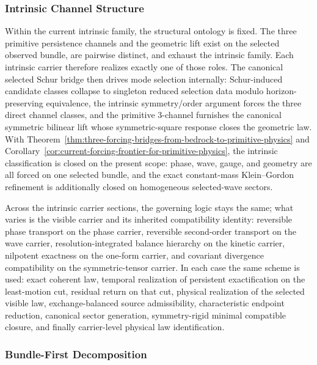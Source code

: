 \subsubsection{Intrinsic Channel Structure}

Within the current intrinsic family, the structural ontology is fixed. The
three primitive persistence channels and the geometric lift exist on the
selected observed bundle, are pairwise distinct, and exhaust the intrinsic
family. Each intrinsic carrier therefore realizes exactly one of
those roles. The canonical selected Schur bridge then drives mode selection
internally: Schur-induced candidate classes collapse to singleton reduced
selection data modulo horizon-preserving equivalence, the intrinsic
symmetry/order argument forces the three direct channel classes, and the
primitive \(3\)-channel furnishes the canonical symmetric bilinear lift whose
symmetric-square response closes the geometric law. With
Theorem~\ref{thm:three-forcing-bridges-from-bedrock-to-primitive-physics} and
Corollary~\ref{cor:current-forcing-frontier-for-primitive-physics}, the
intrinsic classification is closed on the present scope:
phase, wave, gauge, and geometry are all forced on one selected bundle, and
the exact constant-mass Klein--Gordon refinement is additionally closed on
homogeneous selected-wave sectors.

Across the intrinsic carrier sections, the governing logic stays the same; what varies
is the visible carrier and its inherited compatibility identity: reversible
phase transport on the phase carrier, reversible second-order transport on the
wave carrier, resolution-integrated balance hierarchy on the kinetic carrier,
nilpotent exactness on the
one-form carrier, and covariant divergence compatibility on the
symmetric-tensor carrier. In each case the same scheme is used: exact
coherent law, temporal realization of persistent exactification on the least-motion
cut, residual return on that cut, physical realization of the selected visible
law, exchange-balanced source admissibility, characteristic endpoint reduction,
canonical sector generation,
symmetry-rigid minimal compatible closure, and finally carrier-level physical
law identification.

\subsubsection{Bundle-First Decomposition}

